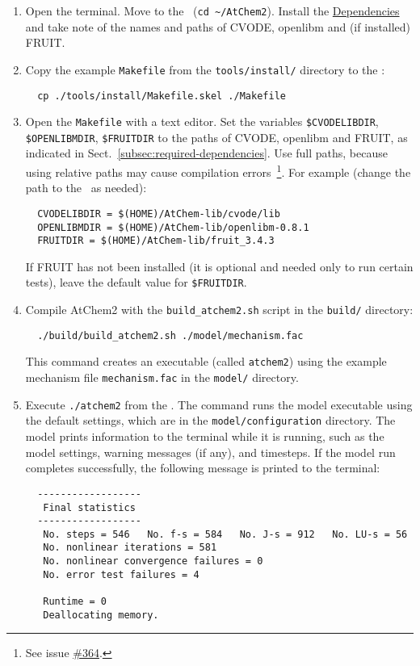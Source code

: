 \begin{enumerate}
\item Open the terminal. Move to the \maindir\ (\verb|cd ~/AtChem2|).
  Install the \hyperref[sec:dependencies]{Dependencies} and take note
  of the names and paths of CVODE, openlibm and (if installed) FRUIT.
\item Copy the example \texttt{Makefile} from the \texttt{tools/install/}
  directory to the \maindir:
  \begin{verbatim}
  cp ./tools/install/Makefile.skel ./Makefile
  \end{verbatim}
\item Open the \texttt{Makefile} with a text editor. Set the variables
  \texttt{\$CVODELIBDIR}, \texttt{\$OPENLIBMDIR}, \texttt{\$FRUITDIR} to
  the paths of CVODE, openlibm and FRUIT, as indicated in
  Sect.~\ref{subsec:required-dependencies}. Use full paths, because
  using relative paths may cause compilation errors~\footnote{See
    issue \href{https://github.com/AtChem/AtChem2/issues/364}{\#364}.}.
  For example (change the path to the \depdir\ as needed):
  \begin{verbatim}
  CVODELIBDIR = $(HOME)/AtChem-lib/cvode/lib
  OPENLIBMDIR = $(HOME)/AtChem-lib/openlibm-0.8.1
  FRUITDIR = $(HOME)/AtChem-lib/fruit_3.4.3
  \end{verbatim}
  If FRUIT has not been installed (it is optional and needed only to
  run certain tests), leave the default value for \texttt{\$FRUITDIR}.
\item Compile AtChem2 with the \texttt{build\_atchem2.sh} script in
  the \texttt{build/} directory:
  \begin{verbatim}
  ./build/build_atchem2.sh ./model/mechanism.fac
  \end{verbatim}
  This command creates an executable (called \texttt{atchem2}) using
  the example mechanism file \texttt{mechanism.fac} in the
  \texttt{model/} directory.
\item Execute \verb|./atchem2| from the \maindir. The command runs
  the model executable using the default settings, which are in the
  \texttt{model/configuration} directory. The model prints information
  to the terminal while it is running, such as the model settings,
  warning messages (if any), and timesteps. If the model run completes
  successfully, the following message is printed to the terminal:
  \begin{verbatim}
  ------------------
   Final statistics
  ------------------
   No. steps = 546   No. f-s = 584   No. J-s = 912   No. LU-s = 56
   No. nonlinear iterations = 581
   No. nonlinear convergence failures = 0
   No. error test failures = 4

   Runtime = 0
   Deallocating memory.
  \end{verbatim}
\end{enumerate}

